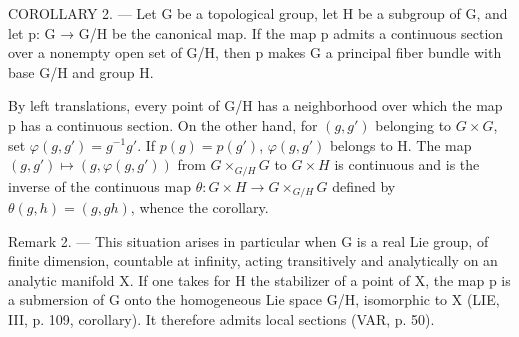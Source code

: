 COROLLARY 2. --- Let G be a topological group, let H be a subgroup of G, and let p: G → G/H be the canonical map. If the map p admits a continuous section over a nonempty open set of G/H, then p makes G a principal fiber bundle with base G/H and group H.

By left translations, every point of G/H has a neighborhood over which the map p has a continuous section. On the other hand, for \((g,g')\) belonging to \(G\times G\), set \(\varphi(g,g')=g^{-1}g'\). If \(p(g)=p(g')\), \(\varphi(g,g')\) belongs to H. The map \((g,g')\mapsto(g,\varphi(g,g'))\) from \(G\times_{G/H}G\) to \(G\times H\) is continuous and is the inverse of the continuous map \(\theta: G\times H\to G\times_{G/H}G\) defined by \(\theta(g,h)=(g,gh)\), whence the corollary.

Remark 2. --- This situation arises in particular when G is a real Lie group, of finite dimension, countable at infinity, acting transitively and analytically on an analytic manifold X. If one takes for H the stabilizer of a point of X, the map p is a submersion of G onto the homogeneous Lie space G/H, isomorphic to X (LIE, III, p. 109, corollary). It therefore admits local sections (VAR, p. 50).
\relax{}
